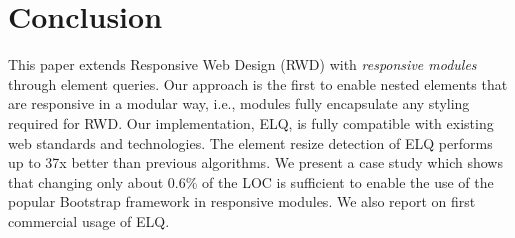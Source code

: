 \documentclass[lnbip]{svmultln}
\newcommand{\elq}{ELQ}
\newcommand{\comment}[1]{}
\begin{document}
  \comment{
  \noindent
  The rest of the paper is organized as follows.
  Section~\ref{sec:elq} introduces \elq{} and its API from a user's perspective.
  Section~\ref{sec:imp} provides an overview of the implementation of \elq{}'s element resize detection system.
  In Section~\ref{sec:eval} we evaluate the performance of \elq{} and report on case studies.
  Section~\ref{sec:discussion} discusses limitations of \elq{} and related libraries, as well as the current state of standardization of element queries.
  Section~\ref{sec:related} relates \elq{} to prior work, and Section~\ref{sec:conclusion} concludes.}

\section{Conclusion}\label{sec:conclusion}

  This paper extends Responsive Web Design (RWD) with {\em responsive
    modules} through element queries.  Our approach is the first to
  enable nested elements that are responsive in a modular way, i.e.,
  modules fully encapsulate any styling required for RWD.  Our
  implementation, \elq{}, is fully compatible with existing web
  standards and technologies. The element resize detection of \elq{}
  performs up to 37x better than previous algorithms.  We present a
  case study which shows that changing only about 0.6\% of the LOC is
  sufficient to enable the use of the popular Bootstrap framework in
  responsive modules.  We also report on first commercial usage of
  \elq{}.

  \comment{
  We believe \elq{} is an important contribution to realizing a
  modular form of element queries, in particular since standardization
  bodies like the RICG do not intend to standardize a complete
  solution.  In the future we intend to improve \elq{} by using
  forthcoming standards developed by the RICG to avoid some current
  limitations.}

%
%

%
\end{document}
